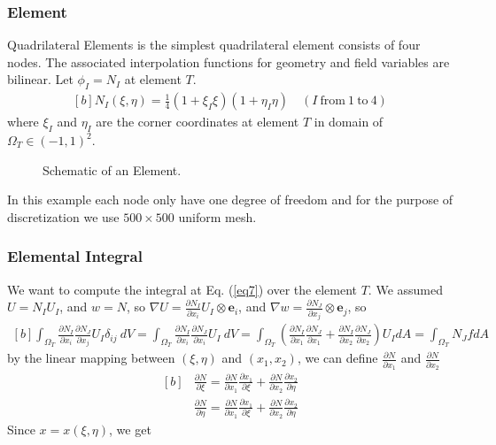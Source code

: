 \documentclass[]{article}
\begin{document}
\subsubsection{Element} \label{sec: elem}
Quadrilateral Elements is the simplest quadrilateral element consists of
four nodes. The associated interpolation functions for geometry and ﬁeld
variables are bilinear. Let $\phi_{I}=N_I $ at element $T$.
\begin{equation}\label{eq11}
	\begin{aligned}[b]
		N_{I}(\xi, \eta) = \frac{1}{4}(1+\xi_I\xi)(1+\eta_I\eta) \quad (I \ \text{from} \ 1 \ \text{to} \ 4)
	\end{aligned}
\end{equation}
where $\xi_{I}$ and $\eta_{I}$ are the corner coordinates at element $T$ in domain of $\Omega_{T} \in (-1,1)^2$.

\begin{figure}[htbp]
	\centering
	
	\caption{Schematic of an Element.}
	\label{fig_el}
\end{figure}
%
In this example each node only have one degree of freedom and for the purpose of discretization we use $500 \times 500$ uniform mesh.
\subsubsection{Elemental Integral} \label{sec: elem int}
  We want to compute the integral at Eq. (\ref{eq7}) over the element $T$. We assumed $U=N_I U_I$, and $w = N$, so $\nabla U= \frac{\partial N_I}{\partial x_i} U_I \otimes \mathbf{e}_i$, and  $\nabla w= \frac{\partial N_J}{\partial x_j}  \otimes \mathbf{e}_j$, so 
\begin{equation}\label{eq12}
	\begin{aligned}[b]
		\int_{\Omega_{T}} \frac{\partial N_I}{\partial x_i} \frac{\partial N_J}{\partial x_j} U_I \delta_{ij} \ dV = \int_{\Omega_{T}} \frac{\partial N_I}{\partial x_i} \frac{\partial N_J}{\partial x_i} U_I \ dV= \int_{\Omega_{T}} (\frac{\partial N_I}{\partial x_{1}}
		\frac{\partial N_J}{\partial x_{1}} + \frac{\partial N_I}{\partial x_{2}} 
		\frac{\partial N_J}{\partial x_{2}})U_I dA = \int_{\Omega_{T}} N_J f dA
	\end{aligned}
\end{equation}
by the linear mapping between $(\xi,\eta)$ and $(x_{1},x_2)$, we can define $\frac{\partial N}{\partial x_{1}}$ and $\frac{\partial N}{\partial x_{2}}$
\begin{equation}\label{eq13}
	\begin{aligned}[b]
&
		\frac{\partial N}{\partial \xi} = \frac{\partial N}{\partial x_{1}}\frac{\partial x_{1}}{\partial \xi}+\frac{\partial N}{\partial x_{2}}\frac{\partial x_{2}}{\partial \eta}\\
& 
		\frac{\partial N}{\partial \eta} = \frac{\partial N}{\partial x_{1}}\frac{\partial x_{1}}{\partial \xi}+\frac{\partial N}{\partial x_{2}}\frac{\partial x_{2}}{\partial \eta}
	\end{aligned}
\end{equation}
Since $x=x(\xi,\eta)$, we get
\end{document}
